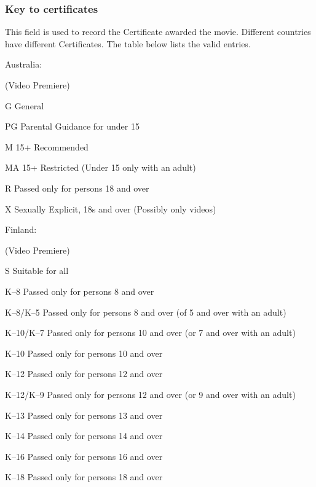 \subsubsection{Key to certificates}

This field is used to record the Certificate awarded the movie. 
Different countries have different Certificates.
The table below lists the valid entries.

\vspace{4mm}

Australia:
\nopagebreak

\vspace{2mm}       
\begin{Ventry}{(Video Premiere)}
\item[G]      General
\item[PG]    Parental Guidance for under 15
\item[M]      15+ Recommended
\item[MA]     15+ Restricted (Under 15 only with an adult)
\item[R]      Passed only for persons 18 and over
\item[X]      Sexually Explicit, 18s and over (Possibly only videos) 
\end{Ventry}

\vspace{4mm}

Finland:
\nopagebreak

\vspace{2mm}
\begin{Ventry}{(Video Premiere)}
\item[S]     Suitable for all
\item[K--8]     Passed only for persons 8 and over
\item[K--8/K--5]     Passed only for persons 8 and over
                 (of 5 and over with an adult)
\item[K--10/K--7]    Passed only for persons 10 and over
                 (or 7 and over with an adult)
\item[K--10]     Passed only for persons 10 and over
\item[K--12]     Passed only for persons 12 and over
\item[K--12/K--9]     Passed only for persons 12 and over
                 (or 9 and over with an adult)
\item[K--13]     Passed only for persons 13 and over
\item[K--14]     Passed only for persons 14 and over
\item[K--16]     Passed only for persons 16 and over
\item[K--18]     Passed only for persons 18 and over
\end{Ventry}

